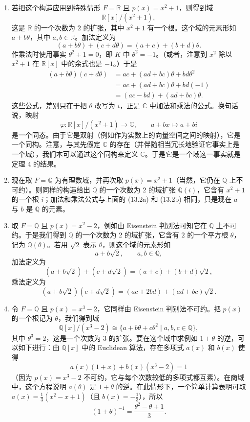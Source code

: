 \begin{enumerate}[label=(\arabic*)]
	\item 若把这个构造应用到特殊情形 $F=\mathbb R$ 且 $p(x)=x^2+1$，则得到域
	\[
	\mathbb R[x]/(x^2+1),
	\]
	这是 $\mathbb R$ 的一个次数为 $2$ 的扩张，其中 $x^2+1$ 有一个根。这个域的元素形如 $a+b\theta$，其中 $a,b\in\mathbb R$。加法定义为
	\[
	(a+b\theta)+(c+d\theta)=(a+c)+(b+d)\theta. \tag{13.2a}
	\]
	作乘法时使用事实 $\theta^2+1=0$，即 $K$ 中 $\theta^2=-1$。（或者，注意到 $x^2$ 除以 $x^2+1$ 在 $\mathbb R[x]$ 中的余式也是 $-1$。）于是
	\begin{equation}
		\begin{aligned}
			(a+b\theta)(c+d\theta)&=ac+(ad+bc)\theta+bd\theta^2\\
			&=ac+(ad+bc)\theta+bd(-1)\\
			&=(ac-bd)+(ad+bc)\theta.
		\end{aligned}
		\tag{13.2b}
	\end{equation}
	这些公式，差别只在于把 $\theta$ 改写为 $i$，正是 $\mathbb C$ 中加法和乘法的公式。换句话说，映射
	\[
	\varphi:\mathbb R[x]/(x^2+1)\longrightarrow \mathbb C,
	\qquad
	a+bx\longmapsto a+bi
	\]
	是一个同态。由于它是双射（例如作为实数上的向量空间之间的映射），它是一个同构。注意，与其先假定 $\mathbb C$ 的存在（并伴随相当冗长地验证它事实上是一个域），我们本可以通过这个同构来定义 $\mathbb C$。于是它是一个域这一事实就是定理 4 的结果。
	
	\item 现在取 $F=\mathbb Q$ 为有理数域，并再次取 $p(x)=x^2+1$（当然，它仍在 $\mathbb Q$ 上不可约）。则同样的构造给出 $\mathbb Q$ 的一个次数为 $2$ 的域扩张 $\mathbb Q(i)$，它含有 $x^2+1$ 的一个根 $i$；加法和乘法公式与上面的 (13.2a) 和 (13.2b) 相同，只是现在 $a$ 与 $b$ 是 $\mathbb Q$ 的元素。
	
	\item 取 $F=\mathbb Q$ 且 $p(x)=x^2-2$，例如由 Eisenstein 判别法可知它在 $\mathbb Q$ 上不可约。于是我们得到 $\mathbb Q$ 的一个次数为 $2$ 的域扩张，它含有 $2$ 的一个平方根 $\theta$，记为 $\mathbb Q(\theta)$。若用 $\sqrt2$ 表示 $\theta$，则这个域的元素形如
	\[
	a+b\sqrt2,
	\qquad a,b\in\mathbb Q,
	\]
	加法定义为
	\[
	(a+b\sqrt2)+(c+d\sqrt2)=(a+c)+(b+d)\sqrt2,
	\]
	乘法定义为
	\[
	(a+b\sqrt2)(c+d\sqrt2)=(ac+2bd)+(ad+bc)\sqrt2.
	\]
	
	\item 令 $F=\mathbb Q$ 且 $p(x)=x^3-2$，它同样由 Eisenstein 判别法不可约。把 $p(x)$ 的一个根记为 $\theta$，我们得到域
	\[
	\mathbb Q[x]/(x^3-2)\cong\{a+b\theta+c\theta^2\mid a,b,c\in\mathbb Q\},
	\]
	其中 $\theta^3=2$，这是一个次数为 $3$ 的扩张。要在这个域中求例如 $1+\theta$ 的逆，可以如下进行：由 $\mathbb Q[x]$ 中的 Euclidean 算法，存在多项式 $a(x)$ 和 $b(x)$ 使得
	\[
	a(x)(1+x)+b(x)(x^3-2)=1
	\]
	（因为 $p(x)=x^3-2$ 不可约，它与每个次数较低的多项式都互素）。在商域中，这个方程说明 $a(\theta)$ 是 $1+\theta$ 的逆。在此情形下，一个简单计算表明可取 $a(x)=\frac13(x^2-x+1)$（且 $b(x)=-\frac13$），所以
	\[
	(1+\theta)^{-1}=\frac{\theta^2-\theta+1}{3}.
	\]
	

\end{enumerate}
